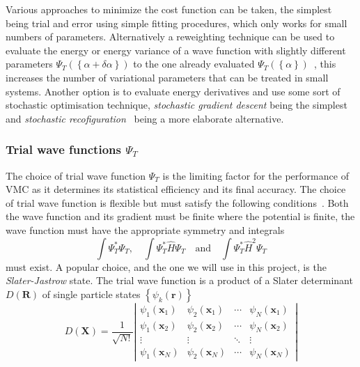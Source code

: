 Various approaches to minimize the cost function can be taken, the simplest being trial and error using simple fitting procedures, which only works for small numbers of parameters. Alternatively a reweighting technique can be used to evaluate the energy or energy variance of a wave function with slightly different parameters $\Psi_{T}(\left\{\alpha + \delta \alpha\right\})$ to the one already evaluated $\Psi_{T}(\left\{\alpha\right\})$~\cite{umrigar1988optimized}, this increases the number of variational parameters that can be treated in small systems. Another option is to evaluate energy derivatives and use some sort of stochastic optimisation technique, \emph{stochastic gradient descent} being the simplest and \emph{stochastic recofiguration}~\cite{sorella1998green} being a more elaborate alternative. 

\subsubsection{Trial wave functions $\Psi_{T}$}
The choice of trial wave function $\Psi_{T}$ is the limiting factor for the performance of VMC as it determines its statistical efficiency and its final accuracy. The choice of trial wave function is flexible but must satisfy the following conditions~\cite{foulkes2001quantum}. Both the wave function and its gradient must be finite where the potential is finite, the wave function must have the appropriate symmetry and integrals 
\begin{equation}
	\int \Psi_{T}^{*} \Psi_{T}, \quad \int \Psi_{T}^{*} \hat{H} \Psi_{T} \quad \text{and} \quad \int \Psi_{T}^{*} \hat{H}^{2} \Psi_{T}
\end{equation}
must exist. A popular choice, and the one we will use in this project, is the \emph{Slater-Jastrow} state. The trial wave function is a product of a Slater determinant $D(\mathbf{R})$ of single particle states $\left\{\psi_k(\mathbf{r})\right\}$ 
\begin{equation}
	D(\mathbf{X}) = \frac{1}{\sqrt{N !}}\left|\begin{array}{cccc}\psi_{1}\left(\mathbf{x}_{1}\right) & \psi_{2}\left(\mathbf{x}_{1}\right) & \cdots & \psi_{N}\left(\mathbf{x}_{1}\right) \\ \psi_{1}\left(\mathbf{x}_{2}\right) & \psi_{2}\left(\mathbf{x}_{2}\right) & \cdots & \psi_{N}\left(\mathbf{x}_{2}\right) \\ \vdots & \vdots & \ddots & \vdots \\ \psi_{1}\left(\mathbf{x}_{N}\right) & \psi_{2}\left(\mathbf{x}_{N}\right) & \cdots & \psi_{N}\left(\mathbf{x}_{N}\right)\end{array}\right|
\end{equation}	
